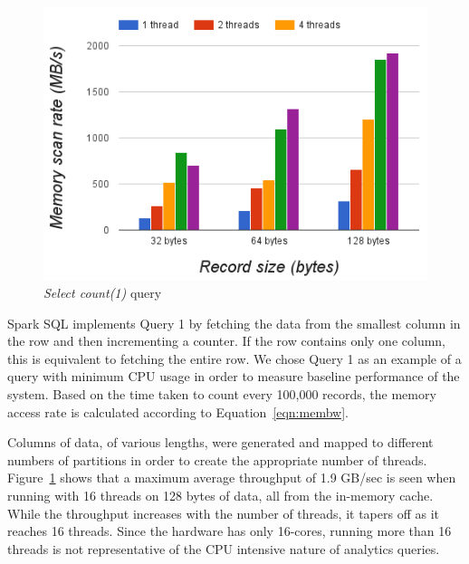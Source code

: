 \documentclass{sig-alternate-05-2015}
\begin{document}
\begin{figure}[h]
\centering
\includegraphics[width=\columnwidth]{mem-scan-rates}
\caption{\label{fig:count1}{\it Select count(1)} query}
\end{figure}

Spark SQL implements Query 1 by fetching the data from the smallest column in
the row and then incrementing a counter. If the row contains only one column,
this is equivalent to fetching the entire row. We chose Query 1 as an example
of a query with minimum CPU usage in order to measure baseline performance of
the system.  Based on the time taken to count every 100,000 records, the memory
access rate is calculated according to Equation~\ref{eqn:membw}.

Columns of data, of various lengths, were generated and mapped to different
numbers of partitions in order to create the appropriate number of threads.
Figure~\ref{fig:count1} shows that a maximum average throughput of 1.9 GB/sec
is seen when running with 16 threads on 128 bytes of data, all from the
in-memory cache. While the throughput increases with the number of threads, it
tapers off as it reaches 16 threads. Since the hardware has only 16-cores,
running more than 16 threads is not representative of the CPU intensive nature
of analytics queries.
\end{document}
